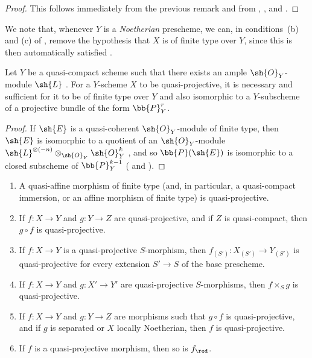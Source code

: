\begin{proof}
This follows immediately from the previous remark and from , , and .
\end{proof}

We note that, whenever $Y$ is a \emph{Noetherian} prescheme, we can, in conditions~(b) and (c) of , remove the hypothesis that $X$ is of finite type over $Y$, since this is then automatically satisfied .

\begin{corollary}[5.3.3]
\label{II.5.3.3}
Let $Y$ be a quasi-compact scheme such that there exists an ample $\sh{O}_Y$-module $\sh{L}$ .
For a $Y$-scheme $X$ to be quasi-projective, it is necessary and sufficient for it to be of finite type over $Y$ and also isomorphic to a $Y$-subscheme of a projective bundle of the form $\bb{P}_Y^r$.
\end{corollary}

\begin{proof}
If $\sh{E}$ is a quasi-coherent $\sh{O}_Y$-module of finite type, then $\sh{E}$ is isomorphic to a quotient of an $\sh{O}_Y$-module $\sh{L}^{\otimes(-n)}\otimes_{\sh{O}_Y}\sh{O}_Y^k$ , and so $\bb{P}(\sh{E})$ is isomorphic to a closed subscheme of $\bb{P}_Y^{k-1}$ ( and ).
\end{proof}

\begin{proposition}[5.3.4]
\label{II.5.3.4}
\medskip\noindent
\begin{enumerate}
  \item[{\rm(i)}] A quasi-affine morphism of finite type (and, in particular, a quasi-compact immersion, or an affine morphism of finite type) is quasi-projective.
  \item[{\rm(ii)}] If $f:X\to Y$ and $g:Y\to Z$ are quasi-projective, and if $Z$ is quasi-compact, then $g\circ f$ is quasi-projective.
  \item[{\rm(iii)}] If $f:X\to Y$ is a quasi-projective $S$-morphism, then $f_{(S')}:X_{(S')}\to Y_{(S')}$ is quasi-projective for every extension $S'\to S$ of the base prescheme.
  \item[{\rm(iv)}] If $f:X\to Y$ and $g:X'\to Y'$ are quasi-projective $S$-morphisms, then $f\times_S g$ is quasi-projective.
  \item[{\rm(v)}] If $f:X\to Y$ and $g:Y\to Z$ are morphisms such that $g\circ f$ is quasi-projective, and if $g$ is separated or $X$ locally Noetherian, then $f$ is quasi-projective.
  \item[{\rm(vi)}] If $f$ is a quasi-projective morphism, then so is $f_\red$.
\end{enumerate}
\end{proposition}

